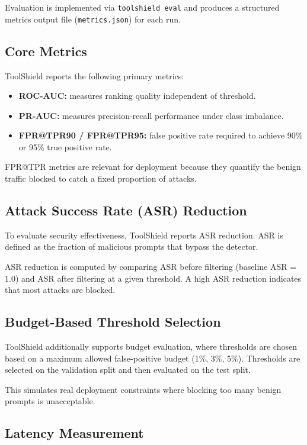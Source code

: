 Evaluation is implemented via \texttt{toolshield eval} and produces a structured metrics output file (\texttt{metrics.json}) for each run.

\subsection{Core Metrics}

ToolShield reports the following primary metrics:

\begin{itemize}
    \item \textbf{ROC-AUC:} measures ranking quality independent of threshold.
    \item \textbf{PR-AUC:} measures precision-recall performance under class imbalance.
    \item \textbf{FPR@TPR90 / FPR@TPR95:} false positive rate required to achieve 90\% or 95\% true positive rate.
\end{itemize}

FPR@TPR metrics are relevant for deployment because they quantify the benign traffic blocked to catch a fixed proportion of attacks.

\subsection{Attack Success Rate (ASR) Reduction}

To evaluate security effectiveness, ToolShield reports ASR reduction. ASR is defined as the fraction of malicious prompts that bypass the detector.

ASR reduction is computed by comparing ASR before filtering (baseline ASR = 1.0) and ASR after filtering at a given threshold. A high ASR reduction indicates that most attacks are blocked.

\subsection{Budget-Based Threshold Selection}

ToolShield additionally supports budget evaluation, where thresholds are chosen based on a maximum allowed false-positive budget (1\%, 3\%, 5\%). Thresholds are selected on the validation split and then evaluated on the test split.

This simulates real deployment constraints where blocking too many benign prompts is unacceptable.

\subsection{Latency Measurement}

